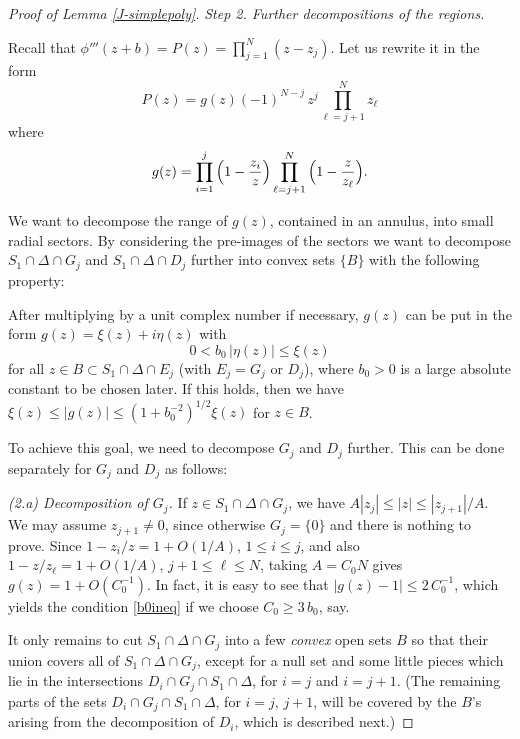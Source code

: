 \documentclass[11 pt]{amsart}
\theoremstyle{plain}
\numberwithin{equation}{section}
\theoremstyle{plain}
\numberwithin{equation}{section}
\theoremstyle{remark}
\begin{document}
\begin{proof}[Proof of Lemma \ref{J-simplepoly}]
\noindent
{\sl Step 2. Further decompositions of the regions.}

Recall that $\phi'''(z+b) = P(z) = \prod_{j=1}^N(z-z_j)$. Let us rewrite it in the form
\begin{equation}\label{gz}
 P(z) = g(z)(-1)^{N-j}\, z^j \prod_{\ell=j+1}^N z_\ell
\end{equation}
where
\[ g(z) = \prod_{i=1}^j \Big(1- {z_i\over z} \Big) \prod_{\ell =j+1}^N \Big(1- {z \over z_\ell} \Big).
 \]

We want to decompose the range of $g(z)$, contained in an annulus, into small radial sectors.
By considering the pre-images of the sectors we want to decompose $S_1 \cap \Delta \cap G_j$ and $S_1 \cap \Delta \cap D_j$ further into convex sets $\{ B\}$ with the following property:

After multiplying by a unit complex number if necessary, $g(z)$ can be put in the form $g(z) = \xi(z) + i \eta(z)$ with
\begin{equation}\label{b0ineq}
0 < b_0 \, |\eta(z)| \le \xi(z)
\end{equation}
for all $z \in B \subset S_1 \cap \Delta \cap E_j$ (with $E_j = G_j$ or $D_j$), where $b_0 >0$ is a large absolute constant to be chosen later. If this holds, then we have $\xi(z) \le |g(z)| \le (1+b_0^{-2})^{1/2} \xi(z)$ for $z\in B$.

\medskip
To achieve this goal, we need to decompose $G_j$ and $D_j$ further. This can be done separately for $G_j$ and $D_j$ as follows:

\medskip
{\sl (2.a) Decomposition of $G_j$.}
If $z\in S_1 \cap \Delta \cap G_j$, we have $A|z_j| \le |z| \le |z_{j+1}|/A$. We may assume $z_{j+1} \not=0$, since otherwise $G_j = \{ 0\}$ and there is nothing to prove.
Since $1- z_i/z= 1+ O(1/A)$, $1\le i\le j$, and also $1- z/z_\ell = 1+ O(1/A)$, $j+1\le \ell \le N$, taking $A= C_0 N$ gives $g(z) = 1+ O(C_0^{-1})$.
In fact, it is easy to see that $|g(z)-1| \le 2 \, C_0^{-1}$, which yields the condition \eqref{b0ineq} if we choose $C_0 \ge 3\, b_0$, say.

It only remains to cut $S_1 \cap \Delta \cap G_j$ into a few {\it convex} open sets $B$ so that their union covers all of $S_1 \cap \Delta \cap  G_j$, except for a null set and some little pieces which lie in the intersections $D_i \cap G_j \cap S_1 \cap \Delta$, for $i=j$ and $i= j+1$. (The remaining parts of the sets $D_i \cap G_j \cap S_1 \cap \Delta$, for $i=j,\, j+1$, will be covered by the $B$'s arising from the decomposition of $D_i$, which is described next.)


\end{proof}
\end{document}
